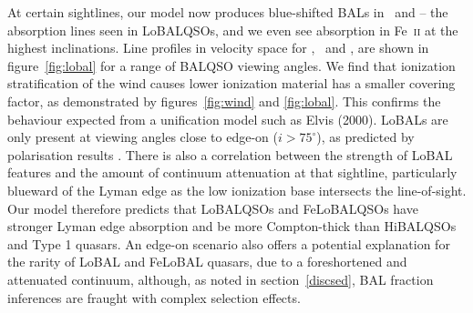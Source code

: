 \documentclass[preprint, a4paper, 11pt]{aastex}
\begin{document}
At certain sightlines, our model now produces blue-shifted BALs in \al\ and \mg --
the absorption lines seen in LoBALQSOs, and we even see absorption in Fe~\textsc{ii}
at the highest inclinations. Line profiles in velocity space 
for \civ, \al\ and \mg, are shown in figure~\ref{fig:lobal} for a range
of BALQSO viewing angles. We find that ionization stratification
of the wind causes lower ionization material has a smaller covering factor, 
as demonstrated by figures~\ref{fig:wind} and \ref{fig:lobal}.
This confirms the behaviour expected from a unification model such as Elvis (2000). 
LoBALs are only present at viewing angles close to edge-on ($i>75^\circ$),
as predicted by polarisation results \citep{brotherton1997}.
There is also a correlation between the strength of LoBAL features
and the amount of continuum attenuation at that sightline, particularly
blueward of the Lyman edge as the low ionization base 
intersects the line-of-sight. 
Our model therefore predicts that LoBALQSOs and FeLoBALQSOs 
have stronger Lyman edge absorption and 
be more Compton-thick than HiBALQSOs and Type 1 quasars.
An edge-on scenario also offers a potential explanation for the rarity of LoBAL and
FeLoBAL quasars, due to a foreshortened and attenuated continuum, 
although, as noted in section~\ref{discsed}, BAL fraction 
inferences are fraught with complex selection effects.














\end{document}
